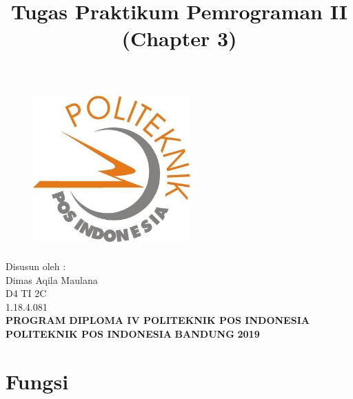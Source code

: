 \documentclass[a4paper, 12pt]{article}
\begin{document}
\title{\huge\textbf{Tugas Praktikum Pemrograman II (Chapter 3)}}
\date{}

\maketitle


\begin{figure}[!ht]
\begin{center}
\includegraphics[width = 6cm, height = 6cm]{poltekpos.jpg}
\end{center}
\end{figure}

\begin{center}
\vspace{1cm}
Disusun oleh :\\
Dimas Aqila Maulana\\
D4 TI 2C\\
1.18.4.081\\
\vspace{1cm}
\textbf{PROGRAM DIPLOMA IV POLITEKNIK POS INDONESIA} \linebreak
\textbf{POLITEKNIK POS INDONESIA} \linebreak
\textbf{BANDUNG}\linebreak
\textbf{2019}

\end{center}


\thispagestyle{empty}


\section{Fungsi}
\end{document}
